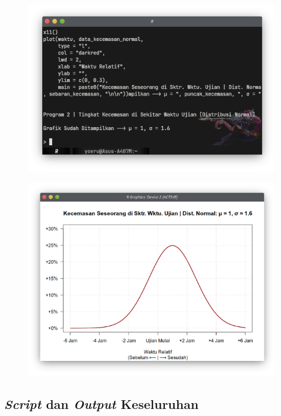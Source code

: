 \begin{figure}[H]
    \centering
    \includegraphics[width=.8\linewidth]{image/Kecemasan Seseorang di Sekitar Waktu Ujian dengan Distribusi Logistik.png}
    \vspace{-\baselineskip}
\end{figure}

\begin{figure}[H]
    \centering
    \includegraphics[width=.8\linewidth]{image/Grafik Kecemasan Seseorang di Sekitar Waktu Ujian dengan Distribusi Logistik.png}
    \vspace{-\baselineskip}
\end{figure}

\subsection{\textit{Script} dan \textit{Output} Keseluruhan}

